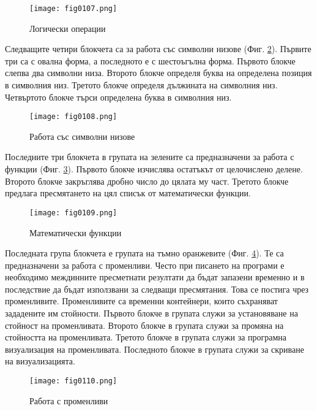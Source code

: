 \begin{figure}[H]
  \centering
  \texttt{[image: fig0107.png]}
  \caption{Логически операции}
\label{fig0107}
\end{figure}

Следващите четири блокчета са за работа със символни низове (Фиг. \ref{fig0108}). Първите три са с овална форма, а последното е с шестоъгълна форма. Първото блокче слепва два символни низа. Второто блокче определя буква на определена позиция в символния низ. Третото блокче определя дължината на символния низ. Четвъртото блокче търси определена буква в символния низ. 

\begin{figure}[H]
  \centering
  \texttt{[image: fig0108.png]}
  \caption{Работа със символни низове}
\label{fig0108}
\end{figure}

Последните три блокчета в групата на зелените са предназначени за работа с функции (Фиг. \ref{fig0109}). Първото блокче изчислява остатъкът от целочислено делене. Второто блокче закръглява дробно число до цялата му част. Третото блокче предлага пресмятането на цял списък от математически функции. 

\begin{figure}[H]
  \centering
  \texttt{[image: fig0109.png]}
  \caption{Математически функции}
\label{fig0109}
\end{figure}

Последната група блокчета е групата на тъмно оранжевите (Фиг. \ref{fig0110}). Те са предназначени за работа с променливи. Често при писането на програми е необходимо междинните пресметнати резултати да бъдат запазени временно и в последствие да бъдат използвани за следващи пресмятания. Това се постига чрез променливите. Променливите са временни контейнери, които съхраняват зададените им стойности. Първото блокче в групата служи за установяване на стойност на променливата. Второто блокче в групата служи за промяна на стойността на променливата. Третото блокче в групата служи за програмна визуализация на променливата. Последното блокче в групата служи за скриване на визуализацията. 

\begin{figure}[H]
  \centering
  \texttt{[image: fig0110.png]}
  \caption{Работа с променливи}
\label{fig0110}
\end{figure}

